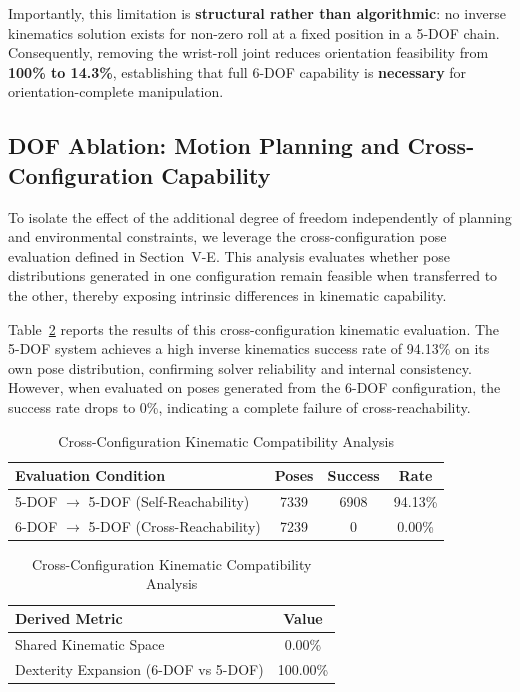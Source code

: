 \documentclass[conference]{IEEEtran}
\begin{document}
	Importantly, this limitation is \textbf{structural rather than algorithmic}: no inverse kinematics solution exists for non-zero roll at a fixed position in a 5-DOF chain. Consequently, removing the wrist-roll joint reduces orientation feasibility from \textbf{100\% to 14.3\%}, establishing that full 6-DOF capability is \textbf{necessary} for orientation-complete manipulation.
	
	\subsection{DOF Ablation: Motion Planning and Cross-Configuration Capability}
	
	To isolate the effect of the additional degree of freedom independently of planning and environmental constraints, we leverage the cross-configuration pose evaluation defined in Section~V-E. This analysis evaluates whether pose distributions generated in one configuration remain feasible when transferred to the other, thereby exposing intrinsic differences in kinematic capability.
	
	Table~\ref{tab:kinematic_ablation} reports the results of this cross-configuration kinematic evaluation. The 5-DOF system achieves a high inverse kinematics success rate of 94.13\% on its own pose distribution, confirming solver reliability and internal consistency. However, when evaluated on poses generated from the 6-DOF configuration, the success rate drops to 0\%, indicating a complete failure of cross-reachability.
	
	\begin{table}[t]
		\centering
		\caption{Cross-Configuration Kinematic Compatibility Analysis}
		\label{tab:kinematic_ablation}
		\begin{tabular}{l|c|c|c}
			\hline
			\textbf{Evaluation Condition} & \textbf{Poses} & \textbf{Success} & \textbf{Rate} \\
			\hline
			5-DOF $\rightarrow$ 5-DOF (Self-Reachability) & 7339 & 6908 & 94.13\% \\
			6-DOF $\rightarrow$ 5-DOF (Cross-Reachability) & 7239 & 0 & 0.00\% \\
			\hline
		\end{tabular}
		\vspace{2mm}
		
		\begin{tabular}{l|c}
			\hline
			\textbf{Derived Metric} & \textbf{Value} \\
			\hline
			Shared Kinematic Space & 0.00\% \\
			Dexterity Expansion (6-DOF vs 5-DOF) & 100.00\% \\
			\hline
		\end{tabular}
	\end{table}
	
\end{document}
